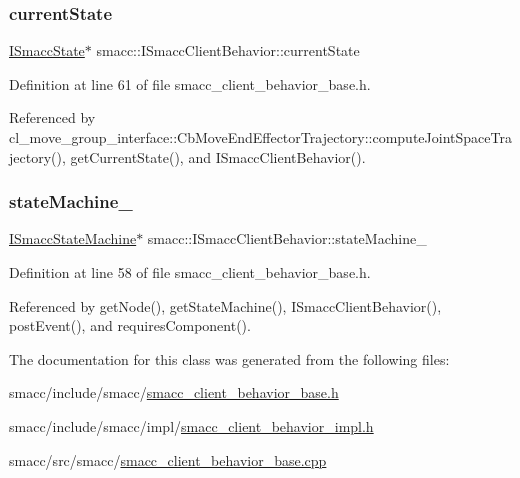 \subsubsection{\texorpdfstring{current\+State}{currentState}}
{\footnotesize\ttfamily \hyperlink{classsmacc_1_1ISmaccState}{I\+Smacc\+State}$\ast$ smacc\+::\+I\+Smacc\+Client\+Behavior\+::current\+State\hspace{0.3cm}{\ttfamily [private]}}



Definition at line 61 of file smacc\+\_\+client\+\_\+behavior\+\_\+base.\+h.



Referenced by cl\+\_\+move\+\_\+group\+\_\+interface\+::\+Cb\+Move\+End\+Effector\+Trajectory\+::compute\+Joint\+Space\+Trajectory(), get\+Current\+State(), and I\+Smacc\+Client\+Behavior().

\mbox{\label{classsmacc_1_1ISmaccClientBehavior_a0fea65db292a8bb3dfba3e5840491d79}} 
\subsubsection{\texorpdfstring{state\+Machine\+\_\+}{stateMachine\_}}
{\footnotesize\ttfamily \hyperlink{classsmacc_1_1ISmaccStateMachine}{I\+Smacc\+State\+Machine}$\ast$ smacc\+::\+I\+Smacc\+Client\+Behavior\+::state\+Machine\+\_\+\hspace{0.3cm}{\ttfamily [private]}}



Definition at line 58 of file smacc\+\_\+client\+\_\+behavior\+\_\+base.\+h.



Referenced by get\+Node(), get\+State\+Machine(), I\+Smacc\+Client\+Behavior(), post\+Event(), and requires\+Component().



The documentation for this class was generated from the following files\+:\begin{DoxyCompactItemize}
\item 
smacc/include/smacc/\hyperlink{include_2smacc_2smacc__client__behavior__base_8h}{smacc\+\_\+client\+\_\+behavior\+\_\+base.\+h}\item 
smacc/include/smacc/impl/\hyperlink{smacc__client__behavior__impl_8h}{smacc\+\_\+client\+\_\+behavior\+\_\+impl.\+h}\item 
smacc/src/smacc/\hyperlink{smacc__client__behavior__base_8cpp}{smacc\+\_\+client\+\_\+behavior\+\_\+base.\+cpp}\end{DoxyCompactItemize}
